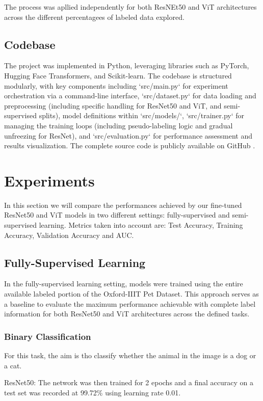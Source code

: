 \documentclass{article}
\begin{document}
The process was apllied independently for both ResNEt50 and ViT architectures across the different percentagees of labeled data explored. 

\subsection{Codebase}
The project was implemented in Python, leveraging libraries such as PyTorch, Hugging Face Transformers, and Scikit-learn. The codebase is structured modularly, with key components including `src/main.py` for experiment orchestration via a command-line interface, `src/dataset.py` for data loading and preprocessing (including specific handling for ResNet50 and ViT, and semi-supervised splits), model definitions within `src/models/`, `src/trainer.py` for managing the training loops (including pseudo-labeling logic and gradual unfreezing for ResNet), and `src/evaluation.py` for performance assessment and results visualization. The complete source code is publicly available on GitHub \cite{OurProject}.

\section{Experiments}
In this section we will compare the performances achieved by our fine-tuned ResNet50 and ViT models in two different settings: fully-supervised and semi-supervised learning. Metrics taken into account are: Test Accuracy, Training Accuracy, Validation Accuracy and AUC.

\subsection{Fully-Supervised Learning}
In the fully-supervised learning setting, models were trained using the entire available labeled portion of the Oxford-IIIT Pet Dataset. This approach serves as a baseline to evaluate the maximum performance achievable with complete label information for both ResNet50 and ViT architectures across the defined tasks.

\subsubsection{Binary Classification}
For this task, the aim is tho classify whether the animal in the image is a dog or a cat.

ResNet50:  The network was then trained for 2 epochs and a final accuracy on a test set was recorded at 99.72\% using learning rate 0.01.
\end{document}
